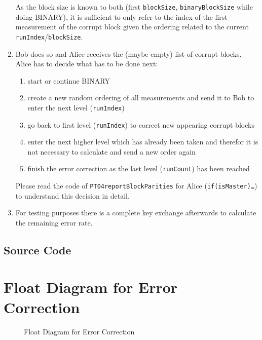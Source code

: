 \documentclass[a4paper,pdftex,DIV18,parskip=half+]{scrartcl}
\begin{document}
\begin{enumerate}
        As the block size is known to both (first \texttt{blockSize},
        \texttt{binaryBlockSize} while doing BINARY), it is sufficient to only
        refer to the index of the first measurement of the corrupt block given
        the ordering related to the current \texttt{runIndex}/\texttt{blockSize}.
  \item Bob does so and Alice receives the (maybe empty) list of corrupt blocks.
        Alice has to decide what has to be done next:
        \begin{enumerate}
          \item start or continue BINARY
          \item create a new random ordering of all measurements and send it to
                Bob to enter the next level (\texttt{runIndex})
          \item go back to first level (\texttt{runIndex}) to correct new
                appearing corrupt blocks
          \item enter the next higher level which has already been taken and therefor
                it is not necessary to calculate and send a new order again
          \item finish the error correction as the last level (\texttt{runCount})
                has been reached
        \end{enumerate}

        Please read the code of \texttt{PT04reportBlockParities} for Alice
        (\texttt{if(isMaster)…}) to understand this decision in detail.

  \item For testing purposes there is a complete key exchange afterwards to
        calculate the remaining error rate.

\end{enumerate}



\newpage
\subsection*{Source Code}



\newpage
\section*{Float Diagram for Error Correction}
\begin{figure}[h!]

\caption{Float Diagram for Error Correction}
\end{figure}
\end{document}
